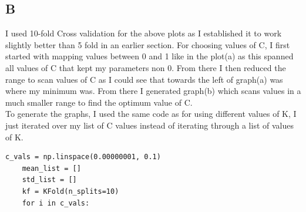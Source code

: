 \documentclass[11pt]{article} %
\begin{document}
\subsection{B}
\begin{figure}[h]
\qquad
{}
\end{figure}
I used 10-fold Cross validation for the above plots as I established it to work slightly better than 5 fold in an earlier section. For choosing values of C, I first started with mapping values between 0 and 1 like in the plot(a) as this spanned all values of C that kept my parameters non 0. From there I then reduced the range to scan values of C as I could see that towards the left of graph(a) was where my minimum was. From there I generated graph(b) which scans values in a much smaller range to find the optimum value of C.
\\
To generate the graphs, I used the same code as for using different values of K, I just iterated over my list of C values instead of iterating through a list of values of K.
\begin{verbatim}
c_vals = np.linspace(0.00000001, 0.1)
    mean_list = []
    std_list = []
    kf = KFold(n_splits=10)
    for i in c_vals:
\end{verbatim}
\end{document}
